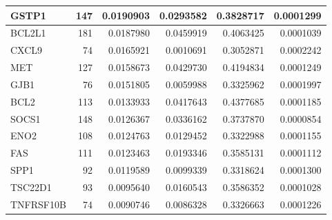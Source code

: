 \documentclass[
]{article}
\begin{document}
\begin{table}[H]
\begin{tabular}[t]{l|r|r|r|r|r}
\hline
GSTP1 & 147 & 0.0190903 & 0.0293582 & 0.3828717 & 0.0001299\\
\hline
BCL2L1 & 181 & 0.0187980 & 0.0459919 & 0.4063425 & 0.0001039\\
\hline
CXCL9 & 74 & 0.0165921 & 0.0010691 & 0.3052871 & 0.0002242\\
\hline
MET & 127 & 0.0158673 & 0.0429730 & 0.4194834 & 0.0001249\\
\hline
GJB1 & 76 & 0.0151805 & 0.0059988 & 0.3325962 & 0.0001997\\
\hline
BCL2 & 113 & 0.0133933 & 0.0417643 & 0.4377685 & 0.0001185\\
\hline
SOCS1 & 148 & 0.0126367 & 0.0336162 & 0.3737870 & 0.0000854\\
\hline
ENO2 & 108 & 0.0124763 & 0.0129452 & 0.3322988 & 0.0001155\\
\hline
FAS & 111 & 0.0123463 & 0.0193346 & 0.3585131 & 0.0001112\\
\hline
SPP1 & 92 & 0.0119589 & 0.0099339 & 0.3318624 & 0.0001300\\
\hline
TSC22D1 & 93 & 0.0095640 & 0.0160543 & 0.3586352 & 0.0001028\\
\hline
TNFRSF10B & 74 & 0.0090746 & 0.0086328 & 0.3326663 & 0.0001226\\
\hline
\end{tabular}
\end{table}
\end{document}
